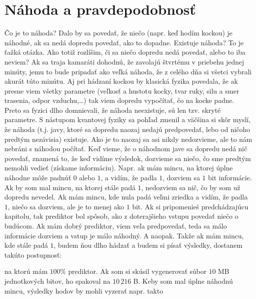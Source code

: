 \chapter{Náhoda a pravdepodobnosť}
\label{sect:nahoda}

Čo je to náhoda? Dalo by sa povedať, že niečo (napr. keď hodím kockou) je náhodné,
ak sa nedá dopredu povedať, ako to dopadne.
Existuje náhoda? To je ťažká otázka. Ako totiž rozlíšim, či sa niečo dopredu nedá povedať,
alebo to iba neviem? Ak sa traja kamaráti dohodnú, že zavolajú štvrtému v priebehu jednej 
minúty, jemu to bude pripadať ako veľká náhoda, že z celého dňa si všetci vybrali akurát
túto minútu. Aj pri hádzaní kockou by klasická fyzika povedala, že ak presne viem všetky
parametre (veľkosť a hustotu kocky, tvar ruky, silu a smer trasenia, odpor vzduchu,\ldots)
tak viem dopredu vypočítať, čo na kocke padne. Preto sa fyzici dlho domnievali, že náhoda
neexistuje, sú len tzv. skryté parametre. S nástupom kvantovej fyziky sa pohľad zmenil
a väčšina si skôr myslí, že náhoda (t.j. javy, ktoré sa dopredu naozaj nedajú predpovedať,
lebo od ničoho predtým nezávisia) existuje. Ako je to naozaj sa asi nikdy nedozvieme, ale
to nám nebráni s náhodou počítať. Keď vieme, že o náhodnom jave sa dopredu nedá nič povedať,
znamená to, že keď vidíme výsledok, dozvieme sa niečo, čo sme predtým nemohli vedieť
(získame informáciu). Napr. ak mám mincu, na ktorej
úplne náhodne môže padnúť $0$ alebo $1$, a vidím, že padla $1$, dozviem sa $1$ bit informácie.
Ak by som mal mincu, na ktorej stále padá $1$, nedozviem sa nič, čo by som už dopredu
nevedel. Ak mám mincu, kde nula padá veľmi zriedka a vidím, že padla $1$, niečo sa dozviem,
ale je to menej ako $1$ bit. Ak si pripomenieš
predchádzajúcu kapitolu, tak prediktor bol spôsob, ako z doterajšieho vstupu povedať
niečo o budúcom. Ak mám dobrý prediktor, viem veľa predpovedať, teda sa málo informácie
dozviem a vstup je málo náhodný. A naopak. Takže ak mám mincu, kde stále padá $1$,
budem ňou dlho hádzať a budem si písať výsledky, dostanem takúto postupnosť:


\centerline{}


na ktorú mám $100\%$ prediktor. Ak som si skúsil vygenerovať súbor $10$ MB jednotkových bitov,
 ho spakoval na $10\,216$ B. Keby som mal úplne náhodnú mincu, výsledky hodov by
mohli vyzerať napr. takto


\centerline{}


